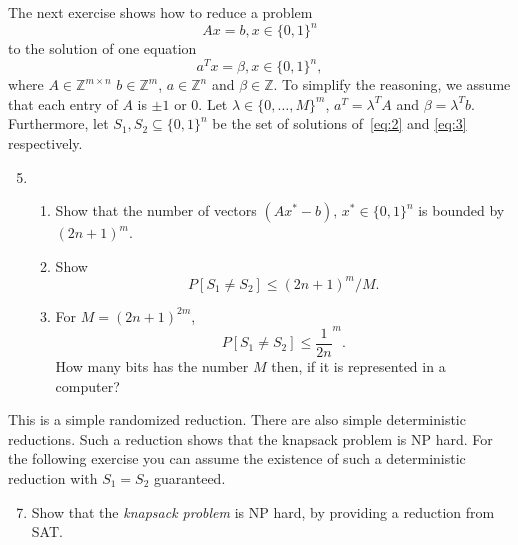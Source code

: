 \documentclass[11pt,a4paper]{article}
\begin{document}
\noindent 
The next exercise shows how to reduce a problem 
\begin{equation} 
  \label{eq:2}
  A x = b, x ∈ \{0,1\}^n   
\end{equation}
to the solution of one equation
\begin{equation}
  \label{eq:3}
   a^T x = β, x ∈ \{0,1\}^n,   
 \end{equation}
 where $A ∈ℤ^{m ×n}$ $b ∈ℤ^m$, $a ∈ℤ^n$ and $β ∈ℤ$. To simplify the reasoning, we assume that each entry of $A$ is $± 1$ or $0$.
 Let $λ ∈ \{ 0,\dots,M\} ^m$,  $a^T = λ^T A$ and $β = λ^T b$. Furthermore, let $S_1, S_2 ⊆ \{0,1\}^n$ be the set of solutions  of~\eqref{eq:2} and \eqref{eq:3} respectively.

 
 \begin{enumerate}
   \setcounter{enumi}{4}
   \begin{enumerate}
 \item  Show that $S_1 ⊆ S_2$ holds.
 \item An element $x^* ∈ \{0,1\}^n$ belongs to $S_2 ⧹S_1$ if and only if $λ ⊥ (A x^* -b)$.
 \item Suppose that $λ $ is chosen i.i.d. at random from $\{ 0,\dots,M\}$ and that $x^* ∈ \{0,1\}^n ⧹S_1$. Show that
   \begin{displaymath}
     P\left[ λ ⊥ (A x^* -b) \right] ≤ 1/M. 
   \end{displaymath}
   
   \end{enumerate} 
   
 \item 
 \begin{enumerate}
 \item Show that the number of vectors $(A x^* -b), \, x^* ∈\{0,1\}^n$ is bounded by $(2 n +1)^m$.
 \item Show 
   \begin{displaymath}
     P \left[ S_1 ≠ S_2\right] ≤ (2 n +1)^m / M. 
   \end{displaymath}
 \item For $M = (2 n +1)^{2m}$,
   \begin{displaymath}
     P \left[ S_1 ≠ S_2\right] ≤ \frac{1}{2n}^m. 
   \end{displaymath}
   How many bits has the number $M$ then, if it is represented in a computer?
   \end{enumerate}
   \end{enumerate}

 \noindent 
 This is a simple randomized reduction. There are also simple deterministic reductions. Such a reduction shows that the knapsack problem is NP hard. For the following exercise you can assume the existence of such a deterministic reduction with $S_1 = S_2$ guaranteed.
 \begin{enumerate}
   \setcounter{enumi}{6}
\item    Show that the \emph{knapsack problem} is NP hard, by providing a reduction from SAT. 
 \end{enumerate}
 
 

%
%


 
\end{document}
